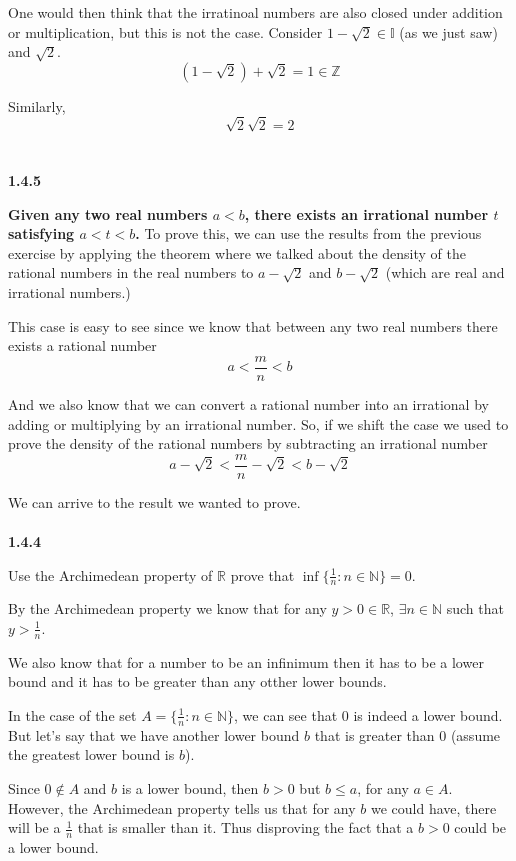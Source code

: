 One would then think that the irratinoal numbers are also closed under addition or multiplication, but this is not the case.
Consider $1 - \sqrt{2} \in \mathbb{I}$ (as we just saw) and $\sqrt{2}$.
$$
( 1 - \sqrt{2} ) + \sqrt{2} = 1 \in \mathbb{Z}
$$

Similarly,
$$
\sqrt{2}\sqrt{2} = 2
$$
\\~\\



\label{abbott:1.4.5}
\textbf{1.4.5}

\textbf{Given any two real numbers $a < b$, there exists an irrational number $t$ satisfying $a < t < b$.}
To prove this, we can use the results from the previous exercise by applying the theorem where we talked about the
density of the rational numbers in the real numbers to $a - \sqrt{2}$ and $b - \sqrt{2}$
(which are real and irrational numbers.)

This case is easy to see since we know that between any two real numbers there exists a rational number
$$
a < \frac{m}{n} < b
$$

And we also know that we can convert a rational number into an irrational by adding or multiplying by an irrational number.
So, if we shift the case we used to prove the density of the rational numbers by subtracting an irrational number
$$
a - \sqrt{2} < \frac{m}{n} - \sqrt{2} < b - \sqrt{2}
$$

We can arrive to the result we wanted to prove.
\\~\\



\textbf{1.4.4}

Use the Archimedean property of $\mathbb{R}$ prove that $\inf \{ \frac{1}{n} : n \in \mathbb{N} \} = 0$.

By the Archimedean property we know that for any $y>0 \in \mathbb{R}$, $\exists n \in \mathbb{N}$ such that
$y > \frac{1}{n}$.

We also know that for a number to be an infinimum then it has to be a lower bound and it has to be greater than any
otther lower bounds.

In the case of the set $A = \{ \frac{1}{n} : n \in \mathbb{N} \}$, we can see that 0 is indeed a lower bound.
But let's say that we have another lower bound $b$ that is greater than 0 (assume the greatest lower bound is $b$).

Since $0 \notin A$ and $b$ is a lower bound, then $b > 0$ but $b \leq a$, for any $a \in A$.
However, the Archimedean property tells us that for any $b$ we could have, there will be a $\frac{1}{n}$ that is smaller than it.
Thus disproving the fact that a $b>0$ could be a lower bound.
\\~\\


